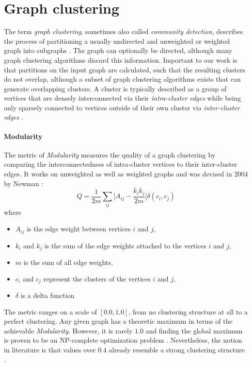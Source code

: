 \documentclass[12pt,a4paper]{report}
\begin{document}
\section{Graph clustering} \label{sect:background-graph-clustering}

The term \textit{graph clustering}, sometimes also called \textit{community
detection}, describes the process of partitioning a usually undirected and
unweighted or weighted graph into subgraphs \cite{lancichinetti2009community}.
The graph can optionally be directed, although many graph clustering algorithms
discard this information. Important to our work is that partitions on the input
graph are calculated, such that the resulting clusters do not overlap, although
a subset of graph clustering algorithms exists that can generate overlapping
clusters. A cluster is typically described as a group of vertices that are
densely interconnected via their \textit{intra-cluster edges} while being only
sparsely connected to vertices outside of their own cluster via \textit{
inter-cluster edges} \cite{lancichinetti2009community, newman2004fast}.

\paragraph{Modularity}
The metric of \textit{Modularity} measures the quality
of a graph clustering by comparing the interconnectedness of intra-cluster
vertices to their inter-cluster edges. It works on unweighted as well as
weighted graphs \cite{clauset2004modularity, blondel2008modularity} and was
devised in 2004 by Newman \cite{newman2004fast}:
\[
  Q =
  \frac{1}{2m}
  \sum \limits _{ij}{\bigg[ A_{ij} - \frac{k_i k_j}{2m} \bigg]}
  \delta (c_i, c_j)
\]
where
\begin{itemize}[noitemsep]
  \item \(A_{ij}\) is the edge weight between vertices \(i\) and \(j\),
  \item \(k_i\) and \(k_j\) is the sum of the edge weights attached to the vertices \(i\) and \(j\),
  \item \(m\) is the sum of all edge weights,
  \item \(c_i\) and \(c_j\) represent the clusters of the vertices \(i\) and \(j\),
  \item \(\delta\) is a delta function
\end{itemize}
The metric ranges on a scale of \([0.0, 1.0]\), from no clustering structure at
all to a perfect clustering. Any given graph has a theoretic maximum in terms
of the achievable \textit{Modularity}. However, it is rarely \(1.0\) and
finding the global maximum is proven to be an NP-complete optimization problem
\cite{brandes2006maximizing}. Nevertheless, the notion in literature is that
values over \(0.4\) already resemble a strong clustering structure
\cite{newman2004fast, fortunato2007resolution}.
\end{document}
